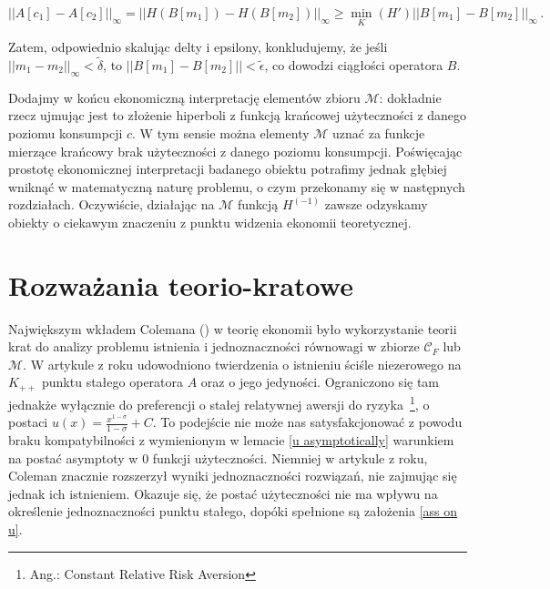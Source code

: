 \begin{equation*}
	|| A[c_1] - A[c_2]||_{\infty} = || H(B[m_1]) - H(B[m_2])||_{\infty} \geq \underset{K}{\min}(H') ||B[m_1] - B[m_2] ||_{\infty}\,.
\end{equation*}

Zatem, odpowiednio skalując delty i epsilony, konkludujemy, że jeśli $ ||m_1-m_2||_{\infty} < \tilde{\delta}$, to $|| B[m_1] - B[m_2]|| < \tilde{\epsilon}$, co dowodzi ciągłości operatora $B$.


Dodajmy w końcu ekonomiczną interpretację elementów zbioru $\mathcal{M}$: dokładnie rzecz ujmując jest to złożenie hiperboli z funkcją krańcowej użyteczności z danego poziomu konsumpcji $c$. W tym sensie można elementy $\mathcal{M}$ uznać za funkcje mierzące krańcowy brak użyteczności z danego poziomu konsumpcji. Poświęcając prostotę ekonomicznej interpretacji badanego obiektu potrafimy jednak głębiej wniknąć w matematyczną naturę problemu, o czym przekonamy się w następnych rozdziałach. Oczywiście, działając na $\mathcal{M}$ funkcją $H^{(-1)}$ zawsze odzyskamy obiekty o ciekawym znaczeniu z punktu widzenia ekonomii teoretycznej.   



\section{Rozważania teorio-kratowe}\label{sec-lattice}




Największym wkładem Colemana (\citeyear{Coleman1, Coleman2}) w teorię ekonomii było wykorzystanie teorii krat do analizy problemu istnienia i jednoznaczności równowagi w zbiorze $ \mathcal{C}_F $ lub $ \mathcal{M} $. W artykule z \citeyear{Coleman1} roku udowodniono twierdzenia o istnieniu ściśle niezerowego na $ K_{++} $ punktu stałego operatora $ A $ oraz o jego jedyności.  Ograniczono się tam jednakże wyłącznie do preferencji o stałej relatywnej awersji do ryzyka~\footnote{Ang.: Constant Relative Risk Aversion}, o postaci $ u(x) = \frac{x^{1 - \sigma}}{1-\sigma} + C $. To podejście nie może nas satysfakcjonować z powodu braku kompatybilności z wymienionym w lemacie \ref{u asymptotically} warunkiem na postać asymptoty w $ 0 $ funkcji użyteczności. Niemniej w artykule z \citeyear{Coleman2} roku, Coleman znacznie rozszerzył wyniki jednoznaczności rozwiązań, nie zajmując się jednak ich istnieniem. Okazuje się, że postać użyteczności nie ma wpływu na określenie jednoznaczności punktu stałego, dopóki spełnione są założenia \ref{ass on u}. 

